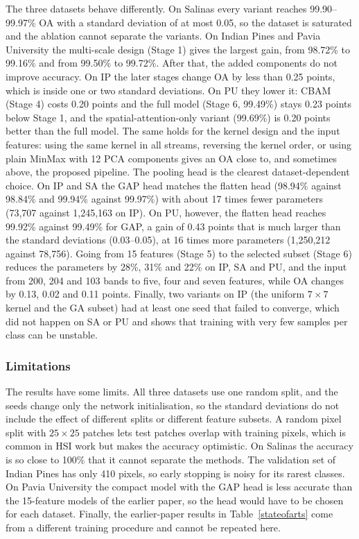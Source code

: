 \documentclass[conference]{IEEEtran}
\begin{document}
	The three datasets behave differently. On Salinas every variant reaches 99.90--99.97\% OA with a standard deviation of at most 0.05, so the dataset is saturated and the ablation cannot separate the variants. On Indian Pines and Pavia University the multi-scale design (Stage 1) gives the largest gain, from 98.72\% to 99.16\% and from 99.50\% to 99.72\%. After that, the added components do not improve accuracy. On IP the later stages change OA by less than 0.25 points, which is inside one or two standard deviations. On PU they lower it: CBAM (Stage 4) costs 0.20 points and the full model (Stage 6, 99.49\%) stays 0.23 points below Stage 1, and the spatial-attention-only variant (99.69\%) is 0.20 points better than the full model. The same holds for the kernel design and the input features: using the same kernel in all streams, reversing the kernel order, or using plain MinMax with 12 PCA components gives an OA close to, and sometimes above, the proposed pipeline. The pooling head is the clearest dataset-dependent choice. On IP and SA the GAP head matches the flatten head (98.94\% against 98.84\% and 99.94\% against 99.97\%) with about 17 times fewer parameters (73,707 against 1,245,163 on IP). On PU, however, the flatten head reaches 99.92\% against 99.49\% for GAP, a gain of 0.43 points that is much larger than the standard deviations (0.03--0.05), at 16 times more parameters (1,250,212 against 78,756). Going from 15 features (Stage 5) to the selected subset (Stage 6) reduces the parameters by 28\%, 31\% and 22\% on IP, SA and PU, and the input from 200, 204 and 103 bands to five, four and seven features, while OA changes by 0.13, 0.02 and 0.11 points. Finally, two variants on IP (the uniform $7\times7$ kernel and the GA subset) had at least one seed that failed to converge, which did not happen on SA or PU and shows that training with very few samples per class can be unstable.
	
	\subsubsection{Limitations}
	The results have some limits. All three datasets use one random split, and the seeds change only the network initialisation, so the standard deviations do not include the effect of different splits or different feature subsets. A random pixel split with $25\times25$ patches lets test patches overlap with training pixels, which is common in HSI work but makes the accuracy optimistic. On Salinas the accuracy is so close to 100\% that it cannot separate the methods. The validation set of Indian Pines has only 410 pixels, so early stopping is noisy for its rarest classes. On Pavia University the compact model with the GAP head is less accurate than the 15-feature models of the earlier paper, so the head would have to be chosen for each dataset. Finally, the earlier-paper results in Table~\ref{stateofarts} come from a different training procedure and cannot be repeated here.
	
\end{document}

